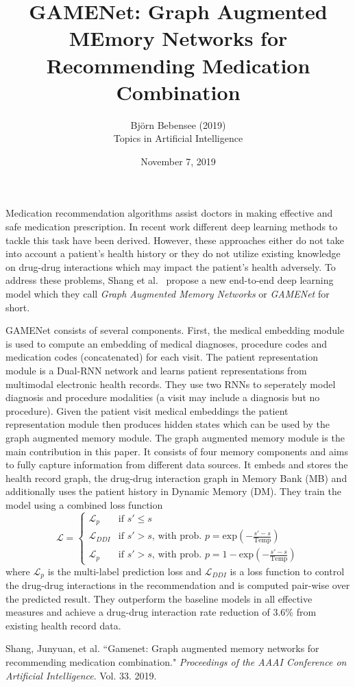 \documentclass[12pt]{article}
\begin{document}
 
 
\title{GAMENet: Graph Augmented MEmory Networks for Recommending Medication Combination}
\author{Bj\"orn Bebensee (2019)\\ %
Topics in Artificial Intelligence}
\date{November 7, 2019}
\maketitle

\noindent
Medication recommendation algorithms assist doctors in making effective and safe medication prescription. In recent work different deep learning methods to tackle this task have been derived. However, these approaches either do not take into account a patient's health history or they do not utilize existing knowledge on drug-drug interactions which may impact the patient's health adversely. To address these problems, Shang et al.~\cite{shang} propose a new end-to-end deep learning model which they call \emph{Graph Augmented Memory Networks} or \emph{GAMENet} for short.

GAMENet consists of several components. First, the medical embedding module is used to compute an embedding of medical diagnoses, procedure codes and medication codes (concatenated) for each visit. The patient representation module is a Dual-RNN network and learns patient representations from multimodal electronic health records. They use two RNNs to seperately model diagnosis and procedure modalities (a visit may include a diagnosis but no procedure). Given the patient visit medical embeddings the patient representation module then produces hidden states which can be used by the graph augmented memory module. The graph augmented memory module is the main contribution in this paper. It consists of four memory components and aims to fully capture information from different data sources. It embeds and stores the health record graph, the drug-drug interaction graph in Memory Bank (MB) and additionally uses the patient history in Dynamic Memory (DM). They train the model using a combined loss function
$$
\mathcal{L} =
    \begin{cases}
        \mathcal{L}_p &         \text{if } s' \leq s\\
        \mathcal{L}_{DDI} &     \text{if } s' > s \text{, with prob. } p = \text{exp}\left( -\frac{s'-s}{\text{Temp}} \right)\\
         \mathcal{L}_p &        \text{if } s' > s \text{, with prob. } p = 1-\text{exp}\left( -\frac{s'-s}{\text{Temp}} \right)
    \end{cases}
$$
where $\mathcal{L}_p$ is the multi-label prediction loss and $\mathcal{L}_{DDI}$ is a loss function to control the drug-drug interactions in the recommendation and is computed pair-wise over the predicted result. They outperform the baseline models in all effective measures and achieve a drug-drug interaction rate reduction of 3.6\% from existing health record data.

\begin{thebibliography}{9}
Shang, Junyuan, et al. ``Gamenet: Graph augmented memory networks for recommending medication combination." \emph{Proceedings of the AAAI Conference on Artificial Intelligence}. Vol. 33. 2019.

\end{thebibliography}
\end{document}
